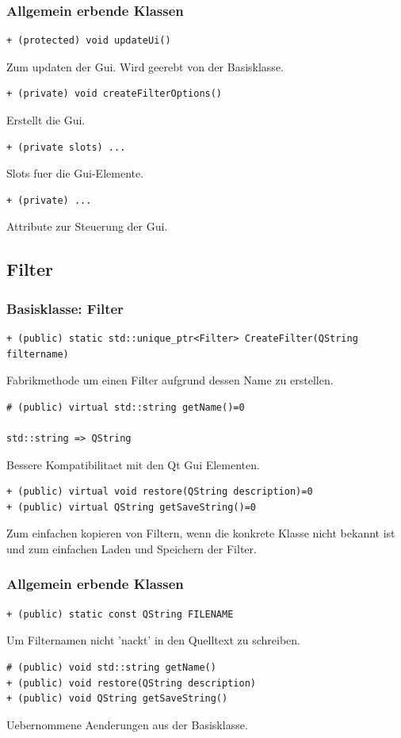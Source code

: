 \documentclass{scrartcl}
\begin{document}
{\subsubsection{Allgemein erbende Klassen}
\begin{verbatim}
+ (protected) void updateUi()
\end{verbatim}
Zum updaten der Gui. Wird geerebt von der Basisklasse.
\begin{verbatim}
+ (private) void createFilterOptions()
\end{verbatim}
Erstellt die Gui.
\begin{verbatim}
+ (private slots) ...
\end{verbatim}
Slots fuer die Gui-Elemente.
\begin{verbatim}
+ (private) ...
\end{verbatim}
Attribute zur Steuerung der Gui.
\newpage
\subsection{Filter}
\subsubsection{Basisklasse: Filter}
\begin{verbatim}
+ (public) static std::unique_ptr<Filter> CreateFilter(QString filtername)
\end{verbatim}
Fabrikmethode um einen Filter aufgrund dessen Name zu erstellen.
\begin{verbatim}
# (public) virtual std::string getName()=0

std::string => QString
\end{verbatim}
Bessere Kompatibilitaet mit den Qt Gui Elementen.

\begin{verbatim}
+ (public) virtual void restore(QString description)=0
+ (public) virtual QString getSaveString()=0
\end{verbatim}
Zum einfachen kopieren von Filtern, wenn die konkrete Klasse nicht bekannt ist und zum einfachen Laden und Speichern der Filter.

\subsubsection{Allgemein erbende Klassen}
\begin{verbatim}
+ (public) static const QString FILENAME
\end{verbatim}
Um Filternamen nicht 'nackt' in den Quelltext zu schreiben.
\begin{verbatim}
# (public) void std::string getName()
+ (public) void restore(QString description)
+ (public) void QString getSaveString()
\end{verbatim}
Uebernommene Aenderungen aus der Basisklasse.
}
\end{document}
